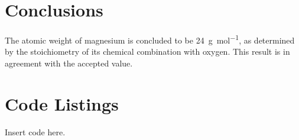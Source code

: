 \documentclass{article}
\begin{document}

\section{Conclusions}

The atomic weight of magnesium is concluded to be \SI{24}{\gram\per\mol}, as determined by the stoichiometry of its chemical combination with oxygen. This result is in agreement with the accepted value.


\section{Code Listings}

Insert code here.
\end{document}
